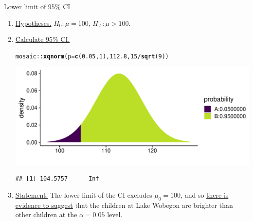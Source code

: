 \documentclass[10pt,handout]{beamer}\usepackage[]{graphicx}\usepackage[]{color}
\makeatletter
\def\maxwidth{ %
  \ifdim\Gin@nat@width>\linewidth
    \linewidth
  \else
    \Gin@nat@width
  \fi
}
\newcommand{\hlnum}[1]{\textcolor[rgb]{0.686,0.059,0.569}{#1}}%
\newcommand{\hlopt}[1]{\textcolor[rgb]{0,0,0}{#1}}%
\newcommand{\hlstd}[1]{\textcolor[rgb]{0.345,0.345,0.345}{#1}}%
\newcommand{\hlkwc}[1]{\textcolor[rgb]{0.333,0.667,0.333}{#1}}%
\newcommand{\hlkwd}[1]{\textcolor[rgb]{0.737,0.353,0.396}{\textbf{#1}}}%
\newenvironment{kframe}{%
 \def\at@end@of@kframe{}%
 \ifinner\ifhmode%
  \def\at@end@of@kframe{\end{minipage}}%
  \begin{minipage}{\columnwidth}%
 \fi\fi%
 \def\FrameCommand##1{\hskip\@totalleftmargin \hskip-\fboxsep
 \colorbox{shadecolor}{##1}\hskip-\fboxsep
     \hskip-\linewidth \hskip-\@totalleftmargin \hskip\columnwidth}%
 \MakeFramed {\advance\hsize-\width
   \@totalleftmargin\z@ \linewidth\hsize
   \@setminipage}}%
 {\par\unskip\endMakeFramed%
 \at@end@of@kframe}
\newenvironment{knitrout}{}{} %
\makeatother
\begin{document}
\begin{frame}[fragile]{Lower limit of 95\% CI}
	\small
	\begin{enumerate}
		\item \underline{Hypotheses.} $H_0: \mu = 100$, $H_A: \mu > 100$.
		\item \underline{Calculate 95\% CI.}
\begin{knitrout}\tiny
{}\color{fgcolor}\begin{kframe}
\begin{alltt}
\hlstd{mosaic}\hlopt{::}\hlkwd{xqnorm}\hlstd{(}\hlkwc{p} \hlstd{=} \hlkwd{c}\hlstd{(}\hlnum{0.05}\hlstd{,}\hlnum{1}\hlstd{),} \hlnum{112.8}\hlstd{,} \hlnum{15}\hlopt{/}\hlkwd{sqrt}\hlstd{(}\hlnum{9}\hlstd{))}
\end{alltt}
\end{kframe}

{\centering \includegraphics[width=\maxwidth]{figure/unnamed-chunk-17-1} 

}


\begin{kframe}\begin{verbatim}
## [1] 104.5757      Inf
\end{verbatim}
\end{kframe}
\end{knitrout}
		\pause 
		\item \underline{Statement.} The lower limit of the CI excludes $\mu_0=100$, and so \underline{there is evidence to suggest} that the children at Lake Wobegon are brighter than other children at the $\alpha=0.05$ level.
	\end{enumerate}
	
\end{frame}
\end{document}
